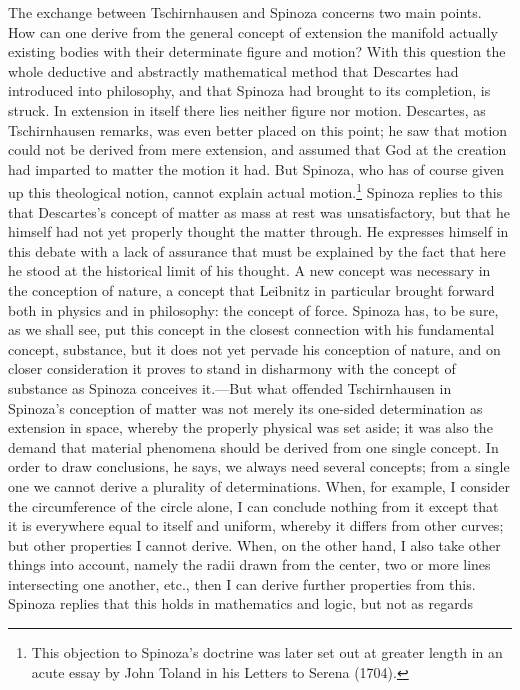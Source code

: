\documentclass[12pt]{book}
\newcommand{\opage}[1]{\marginnote{\footnotesize\textit{[#1]}}}
\begin{document}
The exchange between Tschirnhausen and Spinoza concerns two main points. How can one
derive from the general concept of extension the manifold actually existing bodies with
their determinate figure and motion? With this question the whole deductive and
abstractly mathematical method that Descartes had introduced into philosophy, and that
Spinoza had brought to its completion, is struck. In extension in itself there lies
neither figure nor motion. Descartes, as Tschirnhausen remarks, was even better placed
on this point; he saw that motion could not be derived from mere extension, and assumed
that God at the creation had imparted to matter the motion it had. But Spinoza, who has
of course given up this theological notion, cannot explain actual
motion.\footnote{This objection to Spinoza's doctrine was later set out at greater
length in an acute essay by John Toland in his Letters to Serena (1704).} Spinoza
replies to this that Descartes's concept of matter as mass at rest was unsatisfactory,
but that he himself had not yet properly \opage{69}thought the matter through. He
expresses himself in this debate with a lack of assurance that must be explained by the
fact that here he stood at the historical limit of his thought. A new concept was
necessary in the conception of nature, a concept that Leibnitz in particular brought
forward both in physics and in philosophy: the concept of force. Spinoza has, to be
sure, as we shall see, put this concept in the closest connection with his fundamental
concept, substance, but it does not yet pervade his conception of nature, and on closer
consideration it proves to stand in disharmony with the concept of substance as Spinoza
conceives it.---But what offended Tschirnhausen in Spinoza's conception of matter was
not merely its one-sided determination as extension in space, whereby the properly
physical was set aside; it was also the demand that material phenomena should be
derived from one single concept. In order to draw conclusions, he says, we always need
several concepts; from a single one we cannot derive a plurality of determinations.
When, for example, I consider the circumference of the circle alone, I can conclude
nothing from it except that it is everywhere equal to itself and uniform, whereby it
differs from other curves; but other properties I cannot derive. When, on the other
hand, I also take other things into account, namely the radii drawn from the center,
two or more lines intersecting one another, etc., then I can derive further properties
from this. Spinoza replies that this holds in mathematics and logic, but not as regards
\end{document}
